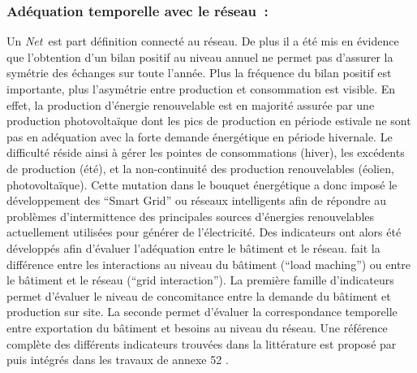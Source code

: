 \subsubsection{Adéquation temporelle avec le réseau~:} %
\label{ssub:adequation_temporelle_avec_le_réseau}
Un \textit{Net}\, est part définition connecté au réseau. De plus il a été mis en évidence
que l’obtention d’un bilan positif au niveau annuel ne permet pas d’assurer la
symétrie des échanges sur toute l’année. Plus la fréquence du bilan positif est importante,
plus l’asymétrie entre production et consommation est visible. En effet, la production
d’énergie renouvelable est en majorité assurée par une production photovoltaïque
dont les pics de production en période estivale ne sont pas en adéquation avec la forte demande
énergétique en période hivernale. Le difficulté réside ainsi à gérer les pointes
de consommations (hiver), les excédents de production (été), et la non-continuité
des production renouvelables (éolien, photovoltaïque).
Cette mutation dans le bouquet énergétique a donc imposé le développement des
\enquote{Smart Grid} ou réseaux intelligents afin de répondre au problèmes d’intermittence
des principales sources d’énergies renouvelables actuellement utilisées pour générer de
l’électricité. Des indicateurs ont alors été développés afin d’évaluer l’adéquation entre
le bâtiment et le réseau. \textcite{Voss2010} fait la différence entre les interactions au
niveau du bâtiment (\enquote{load maching}) ou entre le bâtiment et le réseau
(\enquote{grid interaction}). La première famille d’indicateurs permet d’évaluer le niveau
de concomitance entre la demande du bâtiment et production sur site. La seconde
permet d’évaluer la correspondance temporelle entre exportation du bâtiment et besoins au niveau du
réseau. Une référence complète des différents indicateurs trouvées dans la littérature est
proposé par \textcite{Salom2011} puis intégrés dans les travaux de annexe 52
\parencite{Salom2014}.


